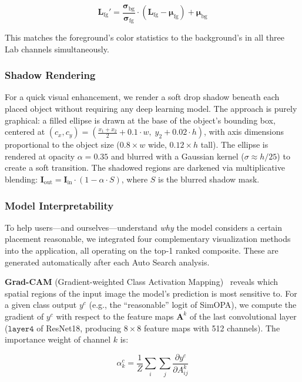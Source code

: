\documentclass[10pt,twocolumn]{article}
\begin{document}
\begin{equation}
\mathbf{L}_{\text{fg}}' = \frac{\bm{\sigma}_{\text{bg}}}{\bm{\sigma}_{\text{fg}}} \cdot (\mathbf{L}_{\text{fg}} - \bm{\mu}_{\text{fg}}) + \bm{\mu}_{\text{bg}}
\end{equation}

This matches the foreground's color statistics to the background's in all three Lab channels simultaneously.

\subsubsection{Shadow Rendering}

For a quick visual enhancement, we render a soft drop shadow beneath each placed object without requiring any deep learning model. The approach is purely graphical: a filled ellipse is drawn at the base of the object's bounding box, centered at $(c_x, c_y) = (\frac{x_1+x_2}{2} + 0.1\cdot w, \; y_2 + 0.02\cdot h)$, with axis dimensions proportional to the object size ($0.8\times w$ wide, $0.12\times h$ tall). The ellipse is rendered at opacity $\alpha = 0.35$ and blurred with a Gaussian kernel ($\sigma \approx h/25$) to create a soft transition. The shadowed regions are darkened via multiplicative blending: $\mathbf{I}_{\text{out}} = \mathbf{I}_{\text{in}} \cdot (1 - \alpha \cdot S)$, where $S$ is the blurred shadow mask.

\subsubsection{Model Interpretability}

To help users---and ourselves---understand \textit{why} the model considers a certain placement reasonable, we integrated four complementary visualization methods into the application, all operating on the top-1 ranked composite. These are generated automatically after each Auto Search analysis.

\textbf{Grad-CAM} (Gradient-weighted Class Activation Mapping)~\cite{gradcam} reveals which spatial regions of the input image the model's prediction is most sensitive to. For a given class output $y^c$ (e.g., the ``reasonable'' logit of SimOPA), we compute the gradient of $y^c$ with respect to the feature maps $\mathbf{A}^k$ of the last convolutional layer ($\texttt{layer4}$ of ResNet18, producing $8\times 8$ feature maps with 512 channels). The importance weight of channel $k$ is:

\begin{equation}
\alpha_k^c = \frac{1}{Z} \sum_{i}\sum_{j} \frac{\partial y^c}{\partial A_{ij}^k}
\end{equation}
\end{document}
